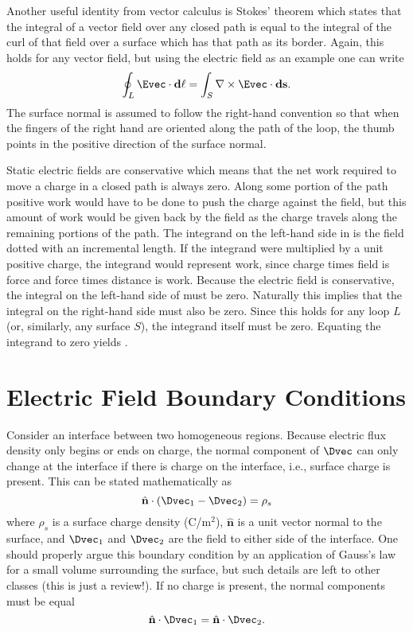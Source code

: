 Another useful identity from vector calculus is Stokes' theorem which
states that the integral of a vector field over any closed path is
equal to the integral of the curl of that field over a surface which
has that path as its border.  Again, this holds for any vector field,
but using the electric field as an example one can write
\begin{equation}
  \oint_L \Evec\cdot\mathbf{d\ell} = 
  \int_S \nabla\times\Evec \cdot \mathbf{ds}.
  \label{eq:stokes}
\end{equation}
The surface normal is assumed to follow the right-hand convention so
that when the fingers of the right hand are oriented along the path of
the loop, the thumb points in the positive direction of the surface
normal.

Static electric fields are conservative which means that the net work
required to move a charge in a closed path is always zero.  Along some
portion of the path positive work would have to be done to push the
charge against the field, but this amount of work would be given back
by the field as the charge travels along the remaining portions of the
path.  The integrand on the left-hand side in  is the
field dotted with an incremental length.  If the integrand were
multiplied by a unit positive charge, the integrand would represent
work, since charge times field is force and force times distance is
work.  Because the electric field is conservative, the integral on the
left-hand side of  must be zero.  Naturally this
implies that the integral on the right-hand side must also be zero.
Since this holds for any loop $L$ (or, similarly, any surface $S$), the
integrand itself must be zero.  Equating the integrand to zero yields
.

\section{Electric Field Boundary Conditions}

Consider an interface between two homogeneous regions.  Because
electric flux density only begins or ends on charge, the normal
component of $\Dvec$ can only change at the interface if there is
charge on the interface, i.e., surface charge is present.  This can be
stated mathematically as
\begin{equation}
 \hat{\mathbf{n}} \cdot(\Dvec_1 - \Dvec_2) = \rho_s
\end{equation}
where $\rho_s$ is a surface charge density (C/m$^2$),
$\hat{\mathbf{n}}$ is a unit vector normal to the surface, and
$\Dvec_1$ and $\Dvec_2$ are the field to either side of the interface.
One should properly argue this boundary condition by an application of
Gauss's law for a small volume surrounding the surface, but such
details are left to other classes (this is just a review!).  If no
charge is present, the normal components must be equal
\begin{equation}
 \hat{\mathbf{n}} \cdot \Dvec_1 = \hat{\mathbf{n}} \cdot \Dvec_2.
\end{equation}

